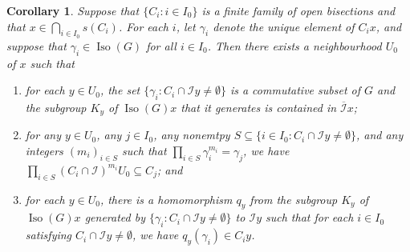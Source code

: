 \documentclass[a4paper, 12pt]{amsart}
\theoremstyle{plain}
\newtheorem{corollary}[theorem]{Corollary}
\theoremstyle{definition}
\theoremstyle{remark}
\newcommand{\Iso}{\operatorname{Iso}}
\newcommand{\Ii}{\mathcal{I}}
\newcommand{\Iicl}{\overline{\mathcal{I}}}
\numberwithin{equation}{section}
\begin{document}
\begin{corollary}\label{cor:all the subgroups}
Suppose
that $\{C_i : i \in I_0\}$ is a finite family of open bisections and that $x
\in \bigcap_{i \in I_0} s(C_i)$. For each $i$, let $\gamma_i$ denote the
unique element of $C_i x$, and suppose that $\gamma_i\in\Iso(G)$ for all $i
\in I_0$. Then there exists a neighbourhood $U_0$ of $x$ such that
\begin{enumerate}[label=\textup{(\roman*)}]
\item\label{it:cor subgps:K_y} for each $y \in U_0$, the set $\{\gamma_i : C_i  \cap \Ii y \not=
    \emptyset\}$ is a commutative subset of $G$ and the subgroup $K_y$ of
    $\Iso(G)x$ that it generates is contained in $\Iicl x$;
\item\label{it:cor subgps:integers} for any $y\in U_0$, any $j \in I_0$,
    any nonemtpy $S\subseteq \{i\in I_0 : C_i \cap \Ii y \not=
    \emptyset\}$, and any integers $(m_i)_{i \in S}$ such that $\prod_{i
    \in S} \gamma_i^{m_i} = \gamma_j$, we have $\prod_{i \in S} (C_i \cap
    \Ii)^{m_i} U_0 \subseteq C_j$; and
\item\label{it:cor subgps:hom} for each $y \in U_0$, there is a
    homomorphism $q_y$ from the subgroup $K_y$ of $\Iso(G) x$ generated by
    $\{\gamma_i : C_i \cap \Ii y \not= \emptyset\}$ to $\Ii y$ such that
    for each $i \in I_0$ satisfying $C_i \cap \Ii y \not= \emptyset$, we
    have $q_y(\gamma_i) \in C_i y$.
\end{enumerate}
\end{corollary}
\end{document}
